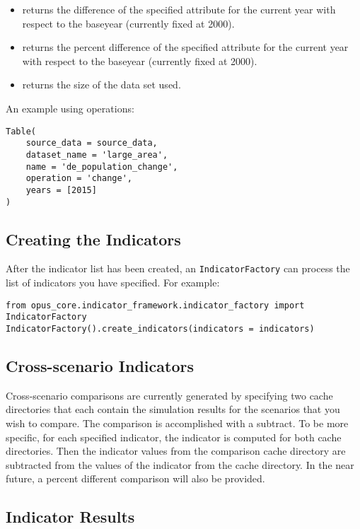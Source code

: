 \begin{itemize}
\tight
  \item {} returns the difference of the specified
  attribute for the current year with respect to the baseyear (currently fixed
  at 2000).
  \item {} returns the percent difference of the specified
  attribute for the current year with respect to the baseyear (currently fixed
  at 2000). 
  \item {} returns the size of the data set used.
\end{itemize}

An example using operations:
\begin{verbatim}
Table(
    source_data = source_data,
    dataset_name = 'large_area',
    name = 'de_population_change',
    operation = 'change',
	years = [2015]
)
\end{verbatim}

\subsection{Creating the Indicators}
After the indicator list has been created, an
\verb|IndicatorFactory| can process the list of indicators you have specified. 
For example:

\begin{verbatim}
from opus_core.indicator_framework.indicator_factory import IndicatorFactory
IndicatorFactory().create_indicators(indicators = indicators)
\end{verbatim}

\subsection{Cross-scenario Indicators}
\label{sec:indicator-cross-scenario}

Cross-scenario comparisons are currently generated by specifying two 
cache directories that each contain the simulation results for the 
scenarios that you wish to compare. The comparison is 
accomplished with a subtract. To be more specific, for each specified 
indicator, the indicator is computed for both cache directories. Then
the indicator values from the comparison cache directory are subtracted
from the values of the indicator from the cache directory. 
In the near future, a percent different comparison will also be provided.

\subsection{Indicator Results}
\label{sec:indicator-results}

